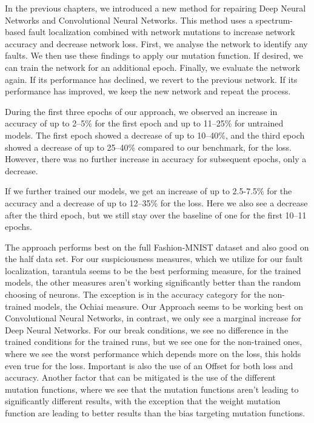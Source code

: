 In the previous chapters, we introduced a new method for repairing Deep Neural Networks and Convolutional Neural Networks.
This method uses a spectrum-based fault localization combined with network mutations to increase network accuracy and decrease network loss.
First, we analyse the network to identify any faults.
We then use these findings to apply our mutation function.
If desired, we can train the network for an additional epoch.
Finally, we evaluate the network again.
If its performance has declined, we revert to the previous network.
If its performance has improved, we keep the new network and repeat the process.

During the first three epochs of our approach, we observed an increase in accuracy of up to 2--5\% for the first epoch and up to 11--25\% for untrained models.
The first epoch showed a decrease of up to 10--40\%, and the third epoch showed a decrease of up to 25--40\% compared to our benchmark, for the loss.
However, there was no further increase in accuracy for subsequent epochs, only a decrease.

If we further trained our models, we get an increase of up to 2.5-7.5\% for the accuracy and a decrease of up to 12--35\% for the loss.
Here we also see a decrease after the third epoch, but we still stay over the baseline of one for the first 10–11 epochs.

The approach performs best on the full Fashion-MNIST dataset and also good on the half data set.
For our suspiciousness measures, which we utilize for our fault localization, tarantula seems to be the best performing measure, for the trained models, the other measures aren't working significantly better than the random choosing of neurons.
The exception is in the accuracy category for the non-trained models, the Ochiai measure.
Our Approach seems to be working best on Convolutional Neural Networks, in contrast, we only see a marginal increase for Deep Neural Networks.
For our break conditions, we see no difference in the trained conditions for the trained runs, but we see one for the non-trained ones, where we see the worst performance which depends more on the loss, this holds even true for the loss.
Important is also the use of an Offset for both loss and accuracy.
Another factor that can be mitigated is the use of the different mutation functions, where we see that the mutation functions aren't leading to significantly different results, with the exception that the weight mutation function are leading to better results than the bias targeting mutation functions.

